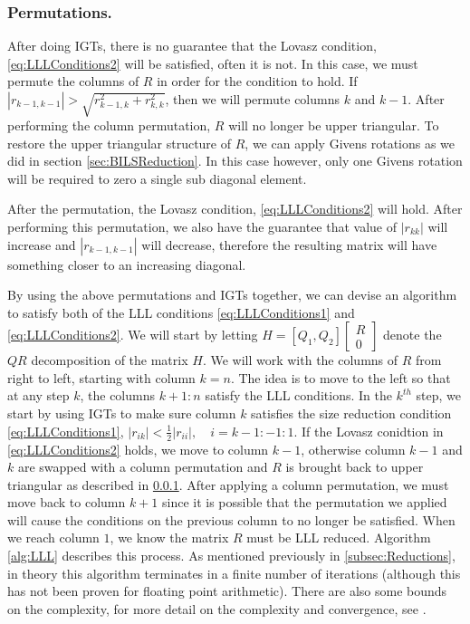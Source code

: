 \documentclass[12pt,Bold,letterpaper]{mcgilletdclass}
\newcommand{\bmx}{\begin{bmatrix}}
\newcommand{\emx}{\end{bmatrix}}
\newcommand{\vsp}{\vspace{\baselineskip}}
\begin{document}
\vsp \subsubsection{Permutations.} \label{subsec:Perm}
After doing IGTs, there is no guarantee that the Lovasz condition,
\eqref{eq:LLLConditions2} will be satisfied, often it is not. In this case, we
must permute the columns of $R$ in order for the condition to hold. If
$|r_{k-1,k-1}| > \sqrt{r^2_{k-1,k} + r^2_{k,k}}$, then we will permute columns
$k$ and $k-1$. After performing the column permutation, $R$ will no longer be
upper triangular. To restore the upper triangular structure of $R$, we can apply
Givens rotations as we did in section \ref{sec:BILSReduction}. In this case
however, only one Givens rotation will be required to zero a single sub diagonal
element.

After the permutation, the Lovasz condition, \eqref{eq:LLLConditions2} will
hold. After performing this permutation, we also have the guarantee that value
of $|r_{kk}|$ will increase and $|r_{k-1,k-1}|$ will decrease, therefore the
resulting matrix will have something closer to an increasing diagonal.

By using the above permutations and IGTs together, we can devise an algorithm to
satisfy both of the LLL conditions \eqref{eq:LLLConditions1} and
\eqref{eq:LLLConditions2}. We will start by letting $H=[Q_1, Q_2] \bmx R \\ 0
\emx$ denote the $QR$ decomposition of the matrix $H$. We will work with the
columns of $R$ from right to left, starting with column $k=n$. The idea is to
move to the left so that at any step $k$, the columns $k+1:n$ satisfy the LLL
conditions. In the $k^{th}$ step, we start by using IGTs to make sure column $k$
satisfies the size reduction condition \eqref{eq:LLLConditions1}, $|r_{ik}| <
\frac{1}{2}|r_{ii}|, \quad i = k-1:-1:1$. If the Lovasz conidtion in
\ref{eq:LLLConditions2} holds, we move to column $k-1$, otherwise column $k-1$
and $k$ are swapped with a column permutation and $R$ is brought back to upper
triangular as described in \ref{subsec:Perm}. After applying a column
permutation, we must move back to column $k+1$ since it is possible that the
permutation we applied will cause the conditions on the previous column to no
longer be satisfied. When we reach column $1$, we know the matrix $R$ must be
LLL reduced. Algorithm \ref{alg:LLL} describes this process. As mentioned
previously in \ref{subsec:Reductions}, in theory this algorithm terminates in a
finite number of iterations (although this has not been proven for floating
point arithmetic). There are also some bounds on the complexity, for more
detail on the complexity and convergence, see \cite{WubSJM11}.
\end{document}
